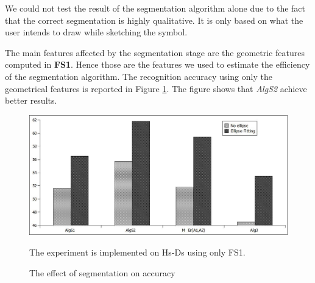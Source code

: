 \documentclass[preprint,10pt,5p,twocolumn]{elsarticle}
\begin{document}
 We could not test the result of the segmentation algorithm alone due to the fact that the correct segmentation is highly qualitative. It is only based on what the user intends to draw while sketching the symbol. 
 
 The main features affected by the segmentation stage are the geometric features computed in \textbf{FS1}. Hence those are the features we used to estimate the efficiency of the segmentation algorithm. The recognition accuracy using only the geometrical features is reported in Figure \ref{fig:testFeatonly}. The figure shows that \textsl{AlgS2} achieve better results.  %
\begin{figure} 
	\centering
		\includegraphics[scale=0.3]{images/OnlyF1EL.jpg}
	\caption{The effect of segmentation on accuracy} The experiment is implemented on Hs-Ds using only FS1.  %
	\label{fig:testFeatonly}
\end{figure}  
\end{document}
